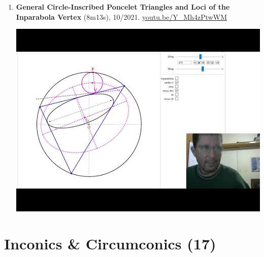 \documentclass[12pt]{article}
\begin{document}
\begin{enumerate}[resume]
% 
\item \textbf{General Circle-Inscribed Poncelet Triangles and Loci of the Inparabola Vertex} (8m13s), 10/2021. \href{https://youtu.be/Y_Mh4zPtwWM}{\url{youtu.be/Y\_Mh4zPtwWM}}
\begin{center}\includegraphics[width=.5\textwidth]{pics/Y_Mh4zPtwWM.jpg}\end{center}
% 
\end{enumerate}

\section{Inconics \& Circumconics (17)}
\end{document}
